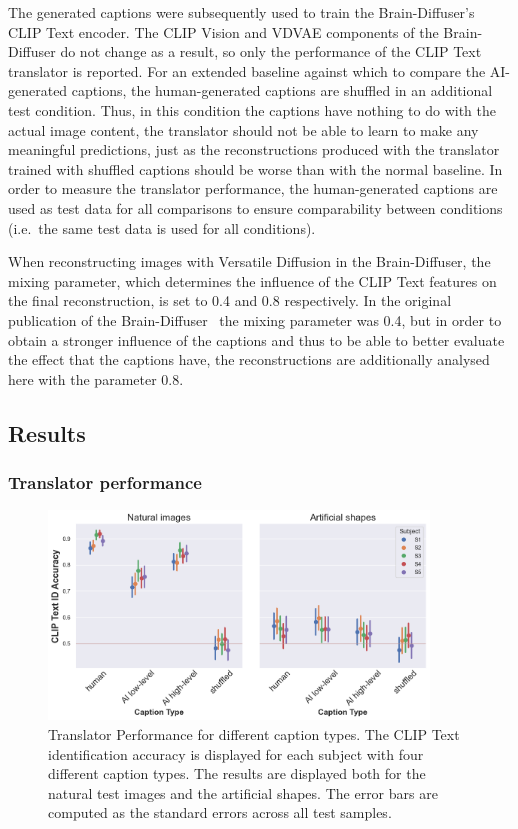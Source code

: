 The generated captions were subsequently used to train the Brain-Diffuser's CLIP Text encoder. The CLIP Vision and VDVAE components of the Brain-Diffuser do not change as a result, so only the performance of the CLIP Text translator is reported. For an extended baseline against which to compare the AI-generated captions, the human-generated captions are shuffled in an additional test condition. Thus, in this condition the captions have nothing to do with the actual image content, the translator should not be able to learn to make any meaningful predictions, just as the reconstructions produced with the translator trained with shuffled captions should be worse than with the normal baseline. In order to measure the translator performance, the human-generated captions are used as test data for all comparisons to ensure comparability between conditions (i.e.\ the same test data is used for all conditions). 

When reconstructing images with Versatile Diffusion in the Brain-Diffuser, the mixing parameter, which determines the influence of the CLIP Text features on the final reconstruction, is set to 0.4 and 0.8 respectively. In the original publication of the Brain-Diffuser~\cite{ozcelikNaturalSceneReconstruction2023} the mixing parameter was 0.4, but in order to obtain a stronger influence of the captions and thus to be able to better evaluate the effect that the captions have, the reconstructions are additionally analysed here with the parameter 0.8.


\subsection{Results}

\subsubsection{Translator performance}

\begin{figure}[ht]
    \centering
    \includegraphics[width=0.9\textwidth]{plots/aicap_translator.png}
    \caption[Experiment 2: Translator performance]{Translator Performance for different caption types. The CLIP Text identification accuracy is displayed for each subject with four different caption types. The results are displayed both for the natural test images and the artificial shapes. The error bars are computed as the standard errors across all test samples.}\label{fig:aicap_translator}
\end{figure}

